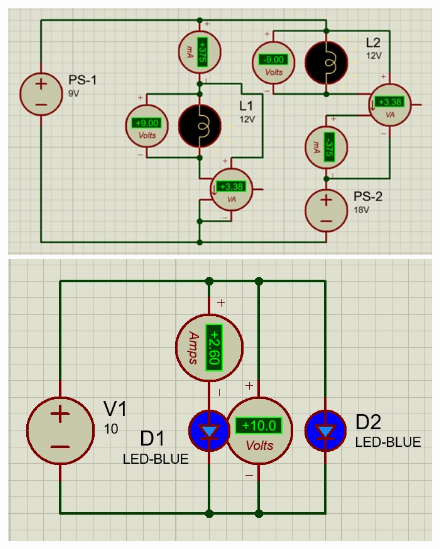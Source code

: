 \begin{figure}[h]
	\begin{minipage}{0.35\textwidth}
		\centering
		\includegraphics[width=0.8\linewidth]{imagenes/5}
		
	\end{minipage}%
	\begin{minipage}{0.35\textwidth}
		\centering
		\includegraphics[width=0.8\linewidth]{imagenes/7}
		
	\end{minipage}
\end{figure}
